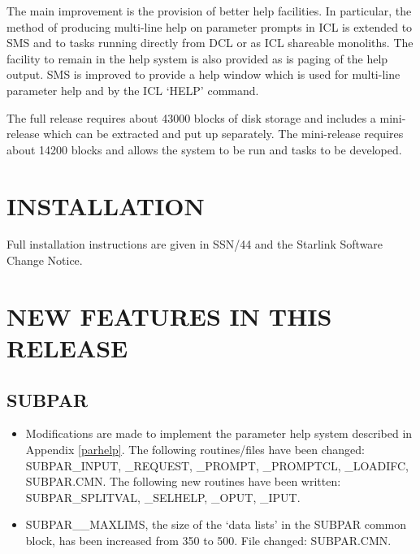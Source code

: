 The main improvement is the provision of better help facilities. In particular,
the method of producing multi-line help on parameter prompts in ICL is 
extended to SMS and to tasks running directly from DCL or as ICL shareable 
monoliths. The facility to remain in the help system is also provided as is 
paging of the help output.
SMS is improved to provide a help window which is used for multi-line parameter
help and by the ICL `HELP' command.

The full release requires about 43000 blocks of disk storage and includes a
mini-release which can be extracted and put up separately.
The mini-release requires about 14200 blocks and allows the system to be run
and tasks to be developed.

\section{INSTALLATION}
Full installation instructions are given in SSN/44 and the Starlink Software 
Change Notice.

\section{NEW FEATURES IN THIS RELEASE}

\subsection{SUBPAR}
\begin{itemize}
\item Modifications are made to implement the parameter help system described
in Appendix \ref{parhelp}.
The following routines/files have been changed: SUB\-PAR\-\_INP\-UT, \_REQU\-EST, 
\_PROMPT, \_PROMP\-TCL, \_LOAD\-IFC, SUB\-PAR.\-CMN.
The following new routines have been written: SUBPAR\-\_SPLIT\-VAL, \_SEL\-HELP,
\_OPUT, \_IPUT.
\item SUBPAR\_\_MAXLIMS, the size of the `data lists' in the SUBPAR common
block, has been increased from 350 to 500.
File changed: SUBPAR.CMN.
\end{itemize}

